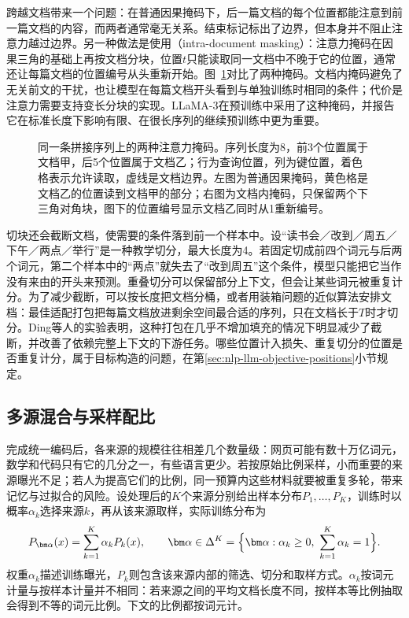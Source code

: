 跨越文档带来一个问题：在普通因果掩码下，后一篇文档的每个位置都能注意到前一篇文档的内容，而两者通常毫无关系。结束标记标出了边界，但本身并不阻止注意力越过边界。另一种做法是使用（intra-document masking）：注意力掩码在因果三角的基础上再按文档分块，位置$t$只能读取同一文档中不晚于它的位置，通常还让每篇文档的位置编号从头重新开始。图~\ref{fig:nlp-llm-data-packing-mask}对比了两种掩码。文档内掩码避免了无关前文的干扰，也让模型在每篇文档开头看到与单独训练时相同的条件；代价是注意力需要支持变长分块的实现。LLaMA-3在预训练中采用了这种掩码，并报告它在标准长度下影响有限、在很长序列的继续预训练中更为重要。

\begin{figure}[htbp]
  \centering
  
  \caption{同一条拼接序列上的两种注意力掩码。序列长度为8，前3个位置属于文档甲，后5个位置属于文档乙；行为查询位置，列为键位置，着色格表示允许读取，虚线是文档边界。左图为普通因果掩码，黄色格是文档乙的位置读到文档甲的部分；右图为文档内掩码，只保留两个下三角对角块，图下的位置编号显示文档乙同时从1重新编号。}
  \label{fig:nlp-llm-data-packing-mask}
\end{figure}

切块还会截断文档，使需要的条件落到前一个样本中。设“读书会／改到／周五／下午／两点／举行”是一种教学切分，最大长度为4。若固定切成前四个词元与后两个词元，第二个样本中的“两点”就失去了“改到周五”这个条件，模型只能把它当作没有来由的开头来预测。重叠切分可以保留部分上下文，但会让某些词元被重复计分。为了减少截断，可以按长度把文档分桶，或者用装箱问题的近似算法安排文档：最佳适配打包把每篇文档放进剩余空间最合适的序列，只在文档长于$T$时才切分。Ding等人的实验表明，这种打包在几乎不增加填充的情况下明显减少了截断，并改善了依赖完整上下文的下游任务。哪些位置计入损失、重复切分的位置是否重复计分，属于目标构造的问题，在第\ref{sec:nlp-llm-objective-positions}小节规定。

\subsection{多源混合与采样配比}
\label{sec:nlp-llm-data-mixture}

完成统一编码后，各来源的规模往往相差几个数量级：网页可能有数十万亿词元，数学和代码只有它的几分之一，有些语言更少。若按原始比例采样，小而重要的来源曝光不足；若人为提高它们的比例，同一预算内这些材料就要被重复多轮，带来记忆与过拟合的风险。设处理后的$K$个来源分别给出样本分布$P_1,\ldots,P_K$，训练时以概率$\alpha_k$选择来源$k$，再从该来源取样，实际训练分布为
\begin{equation}
  P_{\bm\alpha}(x)=\sum_{k=1}^{K}\alpha_kP_k(x),
  \qquad \bm\alpha\in\Delta^{K}=\Bigl\{\bm\alpha:\alpha_k\geq0,\ \sum_{k=1}^{K}\alpha_k=1\Bigr\}.
  \label{eq:nlp-llm-mixture}
\end{equation}
权重$\alpha_k$描述训练曝光，$P_k$则包含该来源内部的筛选、切分和取样方式。$\alpha_k$按词元计量与按样本计量并不相同：若来源之间的平均文档长度不同，按样本等比例抽取会得到不等的词元比例。下文的比例都按词元计。

